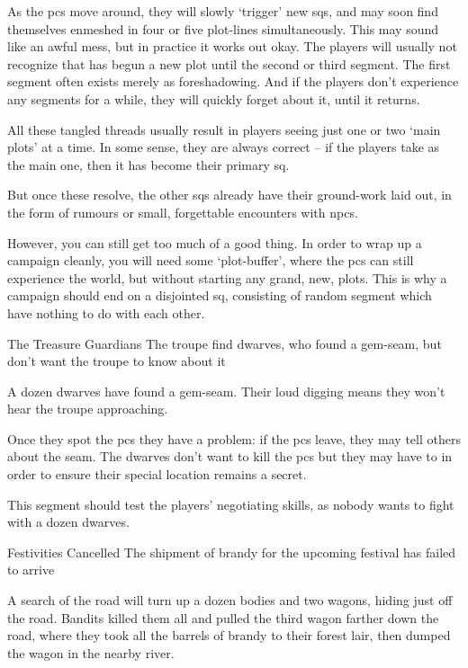 \begin{multicols}{2}

\noindent
As the \glspl{pc} move around, they will slowly `trigger' new \glspl{sq}, and may soon find themselves enmeshed in four or five plot-lines simultaneously.
This may sound like an awful mess, but in practice it works out okay.
The players will usually not recognize that  has begun a new plot until the second or third \gls{segment}.
The first \gls{segment} often exists merely as foreshadowing.
And if the players don't experience any \glspl{segment} for a while, they will quickly forget about it, until it returns.

All these tangled threads usually result in players seeing just one or two `main plots' at a time.
In some sense, they are always correct -- if the players take  as the main one, then it has become their primary \gls{sq}.

But once these resolve, the other \glspl{sq} already have their ground-work laid out, in the form of rumours or small, forgettable encounters with \glspl{npc}.

However, you can still get too much of a good thing.
In order to wrap up a campaign cleanly, you will need some `plot-buffer', where the \glspl{pc} can still experience the world, but without starting any grand, new, plots.
This is why a campaign should end on a disjointed \gls{sq}, consisting of random \gls{segment} which have nothing to do with each other.


{The Treasure Guardians}%
{The troupe find dwarves, who found a gem-seam, but don't want the troupe to know about it}%

A dozen dwarves have found a gem-seam.
Their loud digging means they won't hear the troupe approaching.

Once they spot the \glspl{pc} they have a problem: if the \glspl{pc} leave, they may tell others about the seam.
The dwarves don't want to kill the \glspl{pc} but they may have to in order to ensure their special location remains a secret.

This \gls{segment} should test the players' negotiating skills, as nobody wants to fight with a dozen dwarves.

{Festivities Cancelled}%
{The shipment of brandy for the upcoming festival has failed to arrive}%

A search of the road will turn up a dozen bodies and two wagons, hiding just off the road.
Bandits killed them all and pulled the third wagon farther down the road, where they took all the barrels of brandy to their forest lair, then dumped the wagon in the nearby river.


\end{multicols}
